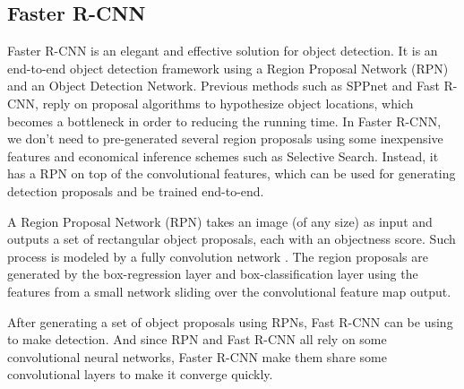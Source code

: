 \subsection{Faster R-CNN}
Faster R-CNN is an elegant and effective solution for object detection. 
It is an end-to-end object detection framework using a Region Proposal Network (RPN) and an Object Detection Network. Previous methods such as SPPnet and Fast R-CNN, reply on proposal algorithms to hypothesize object locations, which becomes a bottleneck in order to reducing the running time. In Faster R-CNN, we don't need to pre-generated several region proposals using some inexpensive features and economical inference schemes such as Selective Search. Instead, it has a RPN on top of the convolutional features, which can be used for generating detection proposals and be trained end-to-end. 

A Region Proposal Network (RPN) takes an image (of any size) as input and outputs a set of rectangular object proposals, each with an objectness score. Such process is modeled by a fully convolution network \cite{long2015fully}. The region proposals are generated by 
the box-regression layer and box-classification layer using the features from a small network sliding over the convolutional feature map output. 

After generating a set of object proposals using RPNs, Fast R-CNN can be using to make detection. And since RPN and Fast R-CNN all rely on some convolutional neural networks, Faster R-CNN make them share some convolutional layers to make it converge quickly.
